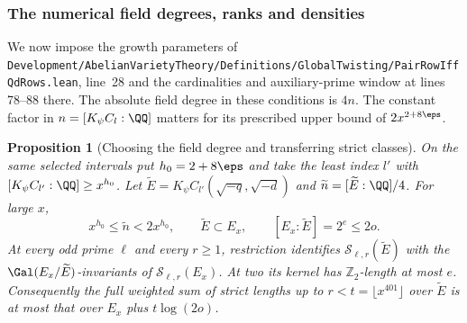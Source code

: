 \documentclass[a4paper,11pt]{article}
\newtheorem{proposition}{Proposition}[section]
\theoremstyle{definition}
\theoremstyle{remark}
\newcommand{\ZZ}{\mathbb Z}\newcommand{\ord}{\operatorname{ord}}
\newcommand{\srcloc}[2]{{\small\nolinkurl{#1.lean}}, line~#2}
\numberwithin{equation}{section}
\begin{document}
\subsubsection{The numerical field degrees, ranks and densities}\label{nav:I-31}
We now impose the growth parameters of
\srcloc{Development/AbelianVarietyTheory/Definitions/GlobalTwisting/PairRowIffQdRows}{28}
and the cardinalities and auxiliary-prime window at lines 78--88
there. The absolute field degree in these conditions is \(4n\). The
constant factor in \(n=[K_\psi C_l:\QQ]\) matters for its prescribed
upper bound of \(2x^{2+8\eps}\).

\begin{proposition}[Choosing the field degree and transferring strict classes]\label{prop:desc50}
On the same selected intervals put \(h_0=2+8\eps\) and take the least
index \(l'\) with \([K_\psi C_{l'}:\QQ]\ge x^{h_0}\). Let
\(\widetilde E=K_\psi C_{l'}(\sqrt{-q},\sqrt{-d})\) and
\(\widetilde n=[\widetilde E:\QQ]/4\). For large \(x\),
\[
 x^{h_0}\le\widetilde n<2x^{h_0},\qquad
 \widetilde E\subset E_x,\qquad [E_x:\widetilde E]=2^e\le 2o .
\]
At every odd prime \(\ell\) and every \(r\ge1\), restriction identifies
\(\mathcal S_{\ell,r}(\widetilde E)\) with the
\(\Gal(E_x/\widetilde E)\)-invariants of \(\mathcal S_{\ell,r}(E_x)\).
At two its kernel has \(\ZZ_2\)-length at most \(e\). Consequently the
full weighted sum of strict lengths up to \(r<t=\lfloor x^{401}\rfloor\)
over \(\widetilde E\) is at most that over \(E_x\) plus
\(t\log(2o)\).
\end{proposition}
\end{document}
